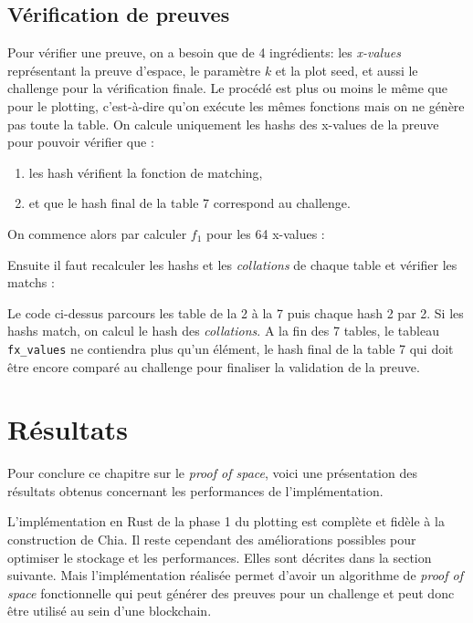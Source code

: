 \subsection{Vérification de preuves}

Pour vérifier une preuve, on a besoin que de 4 ingrédients: les \emph{x-values} représentant la preuve d'espace, le paramètre $k$ et la plot seed, et aussi le challenge pour la vérification finale. Le procédé est plus ou moins le même que pour le plotting, c'est-à-dire qu'on exécute les mêmes fonctions mais on ne génère pas toute la table. On calcule uniquement les hashs des x-values de la preuve pour pouvoir vérifier que :

\begin{enumerate}
  \item les hash vérifient la fonction de matching,
  \item et que le hash final de la table 7 correspond au challenge.
\end{enumerate}

On commence alors par calculer $f_1$ pour les 64 x-values :


\newpage

Ensuite il faut recalculer les hashs et les \emph{collations} de chaque table et vérifier les matchs :


Le code ci-dessus parcours les table de la 2 à la 7 puis chaque hash 2 par 2. Si les hashs match, on calcul le hash des \emph{collations}. A la fin des 7 tables, le tableau \verb|fx_values| ne contiendra plus qu'un élément, le hash final de la table 7 qui doit être encore comparé au challenge pour finaliser la validation de la preuve. 

\section{Résultats}

Pour conclure ce chapitre sur le \emph{proof of space}, voici une présentation des résultats obtenus concernant les performances de l'implémentation.

L'implémentation en Rust de la phase 1 du plotting est complète et fidèle à la construction \cite{chia:construction} de Chia. Il reste cependant des améliorations possibles pour optimiser le stockage et les performances. Elles sont décrites dans la section suivante. Mais l'implémentation réalisée permet d'avoir un algorithme de \emph{proof of space} fonctionnelle qui peut générer des preuves pour un challenge et peut donc être utilisé au sein d'une blockchain.

